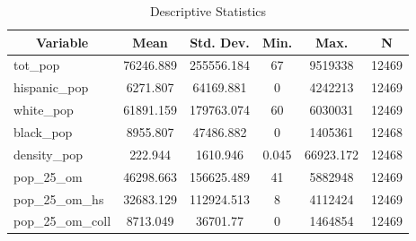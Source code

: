 
\begin{table}[htbp]\centering \caption{Descriptive Statistics \label{desc_stat_tab_2}}
\begin{tabular}{l c c c c c}\hline\hline
\multicolumn{1}{c}{\textbf{Variable}} & \textbf{Mean}
 & \textbf{Std. Dev.}& \textbf{Min.} &  \textbf{Max.} & \textbf{N}\\ \hline
tot\_pop & 76246.889 & 255556.184 & 67 & 9519338 & 12469\\
hispanic\_pop & 6271.807 & 64169.881 & 0 & 4242213 & 12469\\
white\_pop & 61891.159 & 179763.074 & 60 & 6030031 & 12469\\
black\_pop & 8955.807 & 47486.882 & 0 & 1405361 & 12468\\
density\_pop & 222.944 & 1610.946 & 0.045 & 66923.172 & 12468\\
pop\_25\_om & 46298.663 & 156625.489 & 41 & 5882948 & 12469\\
pop\_25\_om\_hs & 32683.129 & 112924.513 & 8 & 4112424 & 12469\\
pop\_25\_om\_coll & 8713.049 & 36701.77 & 0 & 1464854 & 12469\\
\hline\end{tabular}
\end{table}
